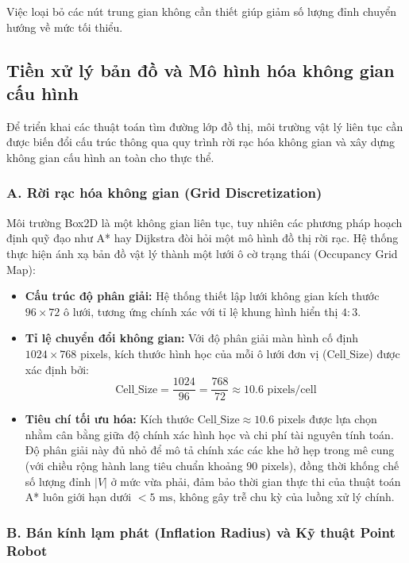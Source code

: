 \documentclass[a4paper, 12pt]{report}
\begin{document}
  \noindent Việc loại bỏ các nút trung gian không cần thiết giúp giảm số lượng đỉnh chuyển hướng về mức tối thiểu. 

  \subsection{Tiền xử lý bản đồ và Mô hình hóa không gian cấu hình}

  Để triển khai các thuật toán tìm đường lớp đồ thị, môi trường vật lý liên tục cần được biến đổi cấu trúc thông qua quy trình rời rạc hóa không gian và xây dựng không gian cấu hình an toàn cho thực thể.

  \subsubsection{A. Rời rạc hóa không gian (Grid Discretization)}

  Môi trường Box2D là một không gian liên tục, tuy nhiên các phương pháp hoạch định quỹ đạo như A* hay Dijkstra đòi hỏi một mô hình đồ thị rời rạc. Hệ thống thực hiện ánh xạ bản đồ vật lý thành một lưới ô cờ trạng thái (Occupancy Grid Map):

  \begin{itemize}
      \item \textbf{Cấu trúc độ phân giải:} Hệ thống thiết lập lưới không gian kích thước $96 \times 72$ ô lưới, tương ứng chính xác với tỉ lệ khung hình hiển thị $4:3$.
      \item \textbf{Tỉ lệ chuyển đổi không gian:} Với độ phân giải màn hình cố định $1024 \times 768$ pixels, kích thước hình học của mỗi ô lưới đơn vị ($\text{Cell\_Size}$) được xác định bởi:
      \begin{equation}
      \text{Cell\_Size} = \frac{1024}{96} = \frac{768}{72} \approx 10.6 \text{ pixels/cell}
      \end{equation}
      \item \textbf{Tiêu chí tối ưu hóa:} Kích thước $\text{Cell\_Size} \approx 10.6$ pixels được lựa chọn nhằm cân bằng giữa độ chính xác hình học và chi phí tài nguyên tính toán. Độ phân giải này đủ nhỏ để mô tả chính xác các khe hở hẹp trong mê cung (với chiều rộng hành lang tiêu chuẩn khoảng $90$ pixels), đồng thời khống chế số lượng đỉnh $|V|$ ở mức vừa phải, đảm bảo thời gian thực thi của thuật toán A* luôn giới hạn dưới $< 5\text{ ms}$, không gây trễ chu kỳ của luồng xử lý chính.
  \end{itemize}

  \subsubsection{B. Bán kính lạm phát (Inflation Radius) và Kỹ thuật Point Robot}
\end{document}
